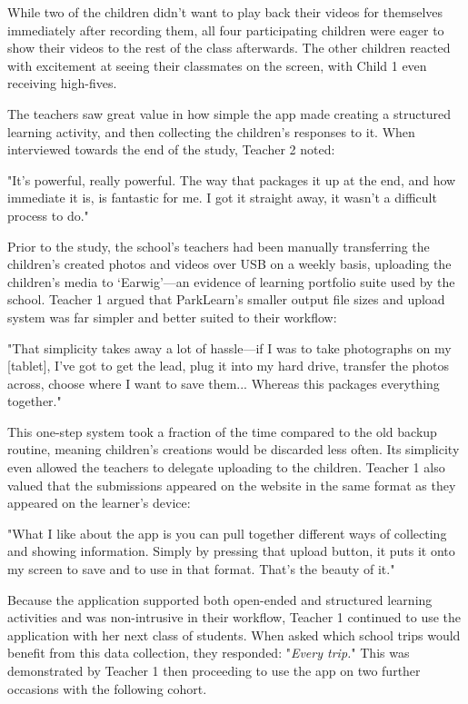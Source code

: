 While two of the children didn’t want to play back their videos for themselves immediately after recording them, all four participating children were eager to show their videos to the rest of the class afterwards. The other children reacted with excitement at seeing their classmates on the screen, with Child 1 even receiving high-fives. 

The teachers saw great value in how simple the app made creating a structured learning activity, and then  collecting the children’s responses to it. When interviewed towards the end of the study, Teacher 2 noted:

\begin{displayquote}
"It’s powerful, really powerful. The way that packages it up at the end, and how immediate it is, is fantastic for me. I got it straight away, it wasn't a difficult process to do."
\end{displayquote}

Prior to the study, the school’s teachers had been manually transferring the children’s created photos and videos over USB on a weekly basis, uploading the children’s media to `Earwig'---an evidence of learning portfolio suite used by the school. Teacher 1 argued that ParkLearn’s smaller output file sizes and upload system was far simpler and better suited to their workflow:

\begin{displayquote}
"That simplicity takes away a lot of hassle---if I was to take photographs on my [tablet], I've got to get the lead, plug it into my hard drive, transfer the photos across, choose where I want to save them... Whereas this packages everything together."
\end{displayquote}

This one-step system took a fraction of the time compared to the old backup routine, meaning children’s creations would be discarded less often. Its simplicity even allowed the teachers to delegate uploading to the children. Teacher 1 also valued that the submissions appeared on the website in the same format as they appeared on the learner’s device: 

\begin{displayquote}
"What I like about the app is you can pull together different ways of collecting and showing information. Simply by pressing that upload button, it puts it onto my screen to save and to use in that format. That’s the beauty of it."
\end{displayquote}

Because the application supported both open-ended and structured learning activities and was non-intrusive in their workflow, Teacher 1 continued to use the application with her next class of students. When asked which school trips would benefit from this data collection, they responded: "\textit{Every trip.}" This was demonstrated by Teacher 1 then proceeding to use the app on two further occasions with the following cohort.


